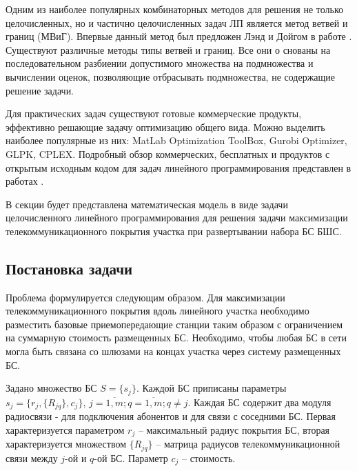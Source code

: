 Одним из наиболее популярных комбинаторных методов для решения не только целочисленных, но и частично целочисленных задач ЛП является метод ветвей и границ (МВиГ). Впервые данный метод  был предложен Лэнд и Дойгом в работе \cite{Land1960}. Существуют различные методы типы ветвей и границ. Все они о снованы на последовательном разбиении допустимого множества на подмножества и вычислении оценок, позволяющие отбрасывать подмножества, не содержащие решение задачи.





Для  практических задач существуют готовые коммерческие продукты, эффективно решающие задачу оптимизацию общего вида. Можно выделить наиболее популярные из них: MatLab Optimization ToolBox, Gurobi Optimizer, GLPK, CPLEX. Подробный обзор коммерческих, бесплатных и продуктов с открытым исходным кодом для задач линейного программирования представлен в работах \cite{Meindl2012, Ku2016, Anand2017}. 

В секции будет представлена математическая модель в виде задачи целочисленного линейного программирования для решения задачи максимизации телекоммуникационного покрытия участка при развертывании набора БС БШС.

\subsection{Постановка задачи}

Проблема формулируется следующим образом. Для максимизации телекоммуникационного покрытия вдоль линейного участка необходимо разместить базовые приемопередающие станции таким образом с ограничением на суммарную стоимость размещенных БС. Необходимо, чтобы любая БС в сети могла быть связана со шлюзами на концах участка через систему размещенных БС.

Задано множество БС $S = \{s_j\}$. Каждой БС приписаны параметры  $s_j = \{r_j, \{R_{jq}\}, c_j \}$, $j = \overline{1,m}; q = \overline{1,m}; q \neq j$. 
Каждая БС содержит два модуля радиосвязи - для подключения абонентов и для связи с соседними БС. Первая характеризуется параметром $r_j$ -- максимальный радиус покрытия БС, вторая характеризуется множеством $\{R_{jq} \}$ -- матрица радиусов телекоммуникационной связи между $j$-ой и $q$-ой БС. Параметр $c_j$ -- стоимость. 

